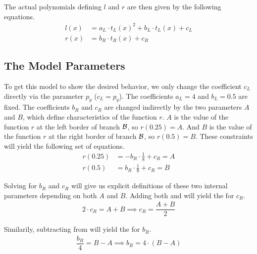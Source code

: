The actual polynomials defining $l$ and $r$ are then given by the following equations.
\begin{align}
    l(x) & = a_L \cdot t_L(x)^2 + b_L \cdot t_L(x) + c_L \\
    r(x) & = b_R \cdot t_R(x) + c_R
    \label{equ:final.def.r}
\end{align}

\subsection{The Model Parameters}

To get this model to show the desired behavior, we only change the coefficient $c_L$ directly via the parameter $p_y$ ($c_L = p_y$).
The coefficients $a_L = 4$ and $b_L = 0.5$ are fixed.
The coefficients $b_R$ and $c_R$ are changed indirectly by the two parameters $A$ and $B$, which define characteristics of the function $r$.
$A$ is the value of the function $r$ at the left border of branch $\mathcal{B}$, so $r(0.25) = A$.
And $B$ is the value of the function $r$ at the right border of branch $\mathcal{B}$, so $r(0.5) = B$.
These constraints will yield the following set of equations.
\begin{subequations}
    \begin{align}
        r(0.25) & = - b_R \cdot \frac{1}{8} + c_R = A
        \label{equ:final.def.param.constr.A}
        \\
        r(0.5)  & = b_R \cdot \frac{1}{8} + c_R = B
        \label{equ:final.def.param.constr.B}
    \end{align}
\end{subequations}

Solving for $b_R$ and $c_R$ will give us explicit definitions of these two internal parameters depending on both $A$ and $B$.
Adding both  and  will yield the  for $c_R$.
\begin{align}
    2 \cdot c_R = A + B \implies c_R = \dfrac{A + B}{2}
    \label{equ:final.def.param.cR}
\end{align}

Similarily, subtracting  from  will yield the  for $b_R$.
\begin{align}
    \dfrac{b_R}{4} = B - A \implies b_R = 4 \cdot (B - A)
    \label{equ:final.def.param.bR}
\end{align}

